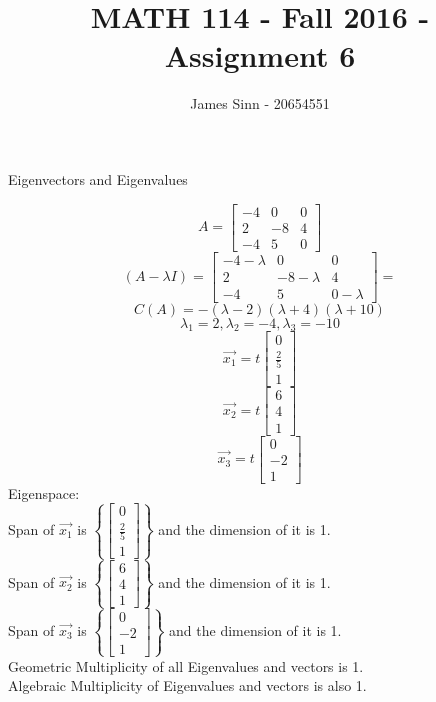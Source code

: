 \documentclass[12pt]{article}
\newcommand{\sqbrl}{\left[}
\newcommand{\sqbrr}{\right]}
\newenvironment{problem}[2][Problem]{\begin{trivlist}
\item[\hskip \labelsep {\bfseries #1}\hskip \labelsep {\bfseries #2.}]}{\end{trivlist}}
\begin{document}
 
 
\title{MATH 114 - Fall 2016 - Assignment 6}
\author{James Sinn - 20654551}
\maketitle
 
 \begin{problem}{1}
	Eigenvectors and Eigenvalues
\end{problem}
\[A= \sqbrl\begin{matrix}-4& 0 & 0\\2 & -8 & 4\\-4&5&0\end{matrix}\sqbrr\]
\[(A- \lambda I) = \sqbrl\begin{matrix}-4 - \lambda& 0 & 0\\2 & -8 - \lambda & 4\\-4&5&0 - \lambda\end{matrix}\sqbrr = \]
\[C(A) = -(\lambda -2 )(\lambda + 4)(\lambda + 10)\]
\[\lambda_1 = 2, \lambda_2 = -4, \lambda_3 = -10\]
\[\vec{x_1} = t\sqbrl\begin{matrix}0\\\frac{2}{5}\\1\end{matrix}\sqbrr\]
\[\vec{x_2} = t\sqbrl\begin{matrix}6\\4\\1\end{matrix}\sqbrr\]
\[\vec{x_3} = t\sqbrl\begin{matrix}0\\-2\\1\end{matrix}\sqbrr\]
Eigenspace:\\
Span of $\vec{x_1}$ is $\left\{\sqbrl\begin{matrix}0\\\frac{2}{5}\\1\end{matrix}\sqbrr\right\}$ and the dimension of it is 1.\\
Span of $\vec{x_2}$ is $\left\{\sqbrl\begin{matrix}6\\4\\1\end{matrix}\sqbrr\right\}$ and the dimension of it is 1.\\
Span of $\vec{x_3}$ is $\left\{\sqbrl\begin{matrix}0\\-2\\1\end{matrix}\sqbrr\right\}$ and the dimension of it is 1.\\
Geometric Multiplicity of all Eigenvalues and vectors is 1.\\
Algebraic Multiplicity of Eigenvalues and vectors is also 1.\\
\end{document}
